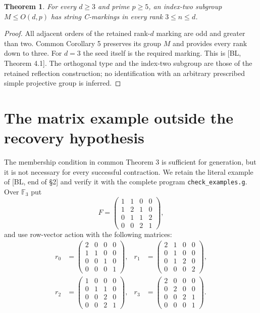 \documentclass[a4paper,11pt]{article}
\newtheorem{theorem}{Theorem}\newtheorem{proposition}[theorem]{Proposition}
\begin{document}
\begin{theorem}\label{oddfield}
For every $d\geq3$ and prime $p\geq5$, an index-two subgroup
$M\leq O(d,p)$ has string C-markings in every rank $3\leq n\leq d$.
\end{theorem}
\begin{proof}
All adjacent orders of the retained rank-$d$ marking are odd and greater
than two. Common Corollary 5 preserves its group $M$ and provides every
rank down to three. For $d=3$ the seed itself is the required marking.
This is [BL, Theorem 4.1]. The orthogonal type and the index-two subgroup
are those of the retained reflection construction; no identification with
an arbitrary prescribed simple projective group is inferred.
\end{proof}

\section{The matrix example outside the recovery hypothesis}
The membership condition in common Theorem 3 is sufficient for generation,
but it is not necessary for every successful contraction. We retain the
literal example of [BL, end of \S2] and verify it with the complete program
\texttt{check\_examples.g}. Over $\mathbb F_3$ put
\[
 F=\begin{pmatrix}1&1&0&0\\1&2&1&0\\0&1&1&2\\0&0&2&1\end{pmatrix},
\]
and use row-vector action with the following matrices:
\[
\begin{alignedat}{2}
 r_0&=\begin{pmatrix}2&0&0&0\\1&1&0&0\\0&0&1&0\\0&0&0&1\end{pmatrix},&
 r_1&=\begin{pmatrix}2&1&0&0\\0&1&0&0\\0&1&2&0\\0&0&0&2\end{pmatrix},\\
 r_2&=\begin{pmatrix}1&0&0&0\\0&1&1&0\\0&0&2&0\\0&0&2&1\end{pmatrix},&
 r_3&=\begin{pmatrix}2&0&0&0\\0&2&0&0\\0&0&2&1\\0&0&0&1\end{pmatrix}.
\end{alignedat}
\]
\end{document}
